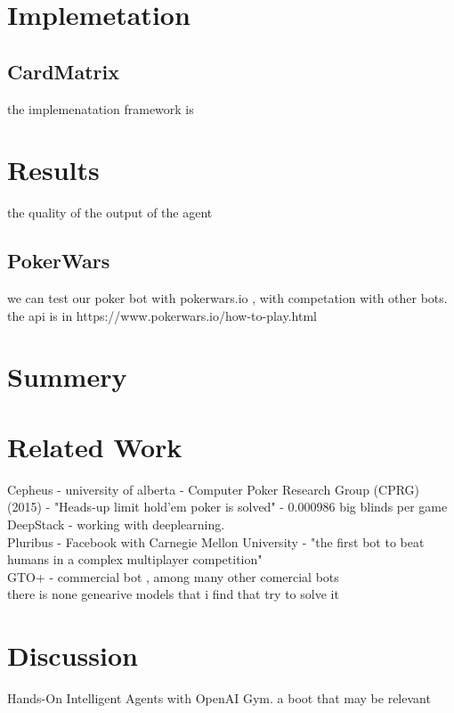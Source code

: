 \documentclass{article}
\begin{document}
\section{Implemetation}
\subsection{CardMatrix}
the implemenatation framework is
\section{Results}
the quality of the output of the agent
\subsection{PokerWars}
we can test our poker bot with pokerwars.io , with competation with other bots.
the api is in https://www.pokerwars.io/how-to-play.html
\section{Summery}
\section{Related Work}
Cepheus   - university of alberta -  Computer Poker Research Group (CPRG) (2015) - "Heads-up limit hold’em poker is solved" - 0.000986 big blinds per game \\
DeepStack - working with deeplearning.\\
Pluribus - Facebook with Carnegie Mellon University -  "the first bot to beat humans in a complex multiplayer competition"\\
GTO+ - commercial bot , among many other comercial bots \\
there is none genearive models that i find that try to solve it
\section{Discussion}
Hands-On Intelligent Agents with OpenAI Gym. a boot that may be relevant
\end{document}
